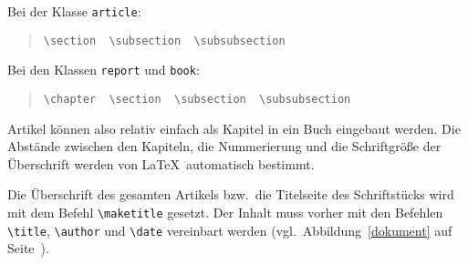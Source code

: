 \pagebreak[3] %
\noindent Bei der Klasse \texttt{article}:
\begin{quote}
\lstinline|\section  \subsection  \subsubsection|
\end{quote}
Bei den Klassen \texttt{report} und \texttt{book}:
\begin{quote}
\lstinline|\chapter  \section  \subsection  \subsubsection|
\end{quote}
Artikel können also relativ einfach als Kapitel in ein Buch
eingebaut werden.  Die Abstände zwischen den Kapiteln, die
Nummerierung und die Schriftgröße der Überschrift werden von
\LaTeX\ automatisch bestimmt.


Die Überschrift des gesamten Artikels bzw.\ die Titelseite des
Schriftstücks wird mit dem Befehl \lstinline|\maketitle| gesetzt.
Der Inhalt muss vorher mit den Befehlen \lstinline|\title|,
\lstinline|\author| und \lstinline|\date| vereinbart werden (vgl.\ 
Abbildung~\ref{dokument} auf Seite~\pageref{dokument}).

